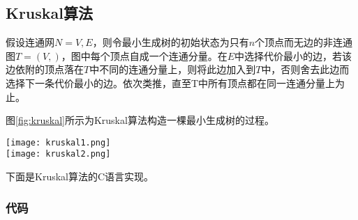 \subsection{Kruskal算法}
\label{sec:kruskal}
假设连通网$N={V, E}$，则令最小生成树的初始状态为只有$n$个顶点而无边的非连通图$T=(V, {})$，图中每个顶点自成一个连通分量。在$E$中选择代价最小的边，若该边依附的顶点落在$T$中不同的连通分量上，则将此边加入到$T$中，否则舍去此边而选择下一条代价最小的边。依次类推，直至T中所有顶点都在同一连通分量上为止。

图\ref{fig:kruskal}所示为Kruskal算法构造一棵最小生成树的过程。

\begin{center}
\texttt{[image: kruskal1.png]}\\
\texttt{[image: kruskal2.png]}\\
\label{fig:kruskal}
\end{center}

下面是Kruskal算法的C语言实现。

\subsubsection{代码}

